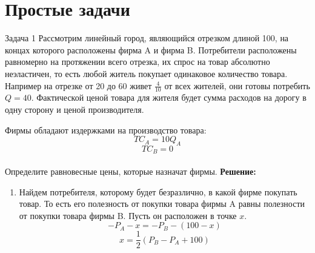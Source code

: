 \section{Простые задачи}

\begin{mybox}{Задача 1}
    \indent\setlength{\parindent}{1em}\indent\setlength{\parindent}{1em}Рассмотрим линейный город, являющийся отрезком длиной 100, на концах которого расположены фирма A и фирма B.
    Потребители
    расположены равномерно на протяжении всего отрезка, их спрос на товар абсолютно неэластичен, то есть любой житель
    покупает одинаковое количество товара. Например на отрезке от 20 до 60 живет $\frac{4}{10}$ от всех жителей,
    они готовы потребить $Q=40$. Фактической ценой товара для жителя будет сумма расходов на дорогу в одну сторону и
    ценой производителя.
    \begin{center}
    \end{center}
    \indent\setlength{\parindent}{1em}\indent\setlength{\parindent}{1em}Фирмы обладают издержками на производство товара:
    $$TC_A=10Q_A$$ $$TC_B=0$$\\
    \indent\setlength{\parindent}{1em}Определите равновесные цены, которые назначат фирмы.
    \tcblower
    \textbf{Решение:}
    \begin{enumerate}
        \item Найдем потребителя, которому будет безразлично, в какой фирме покупать товар. То есть его полезность от
        покупки товара фирмы A равны полезности от покупки товара фирмы B. Пусть он расположен в точке $x$. $$-P_A-x=
        -P_B-(100-x)$$
        $$x=\frac{1}{2}(P_B-P_A+100)$$

\end{enumerate}
\end{mybox}
